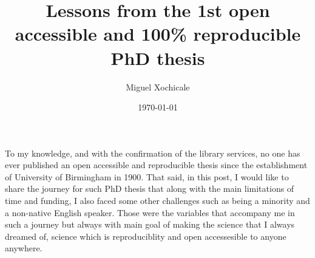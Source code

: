 \documentclass[11pt]{article}
\title{
Lessons from the 1st open accessible and 100\% reproducible 
PhD thesis}
\author{Miguel Xochicale}
\date{\today}
\begin{document}
\maketitle

To my knowledge, and with the confirmation of the library services,
no one has ever published an open accessible and reproducible thesis 
since the establishment of University of Birmingham in 1900.  
That said, in this post, I would like to share the journey 
for such PhD thesis
that along with the main limitations of time and funding, 
I also faced some other challenges %
such as being a minority and a non-native English speaker.  
Those were the variables that accompany me in such a journey 
but 
always with main goal of making the science that 
I always dreamed of, science which is 
reproduciblity and open accessesible to anyone anywhere.




\end{document}
